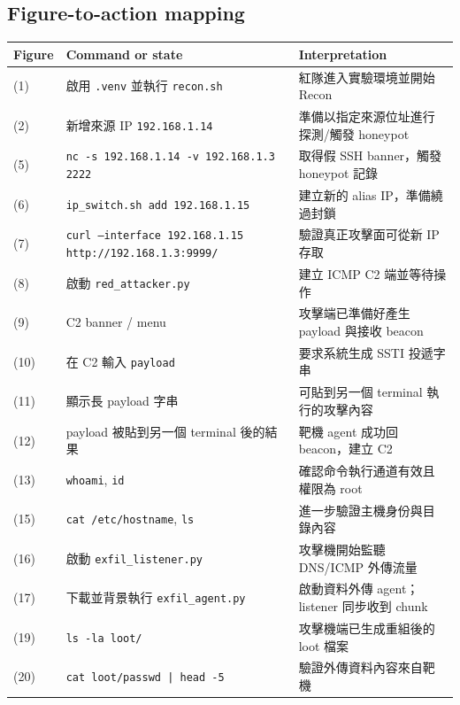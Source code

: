 \documentclass[UTF8,11pt]{ctexart}
\begin{document}
\subsection{Figure-to-action mapping}
\begin{longtable}{>{\raggedright\arraybackslash}p{2.0cm} >{\raggedright\arraybackslash}p{5.0cm} >{\raggedright\arraybackslash}p{6.9cm}}
\toprule
Figure & Command or state & Interpretation \\
\midrule
(1) & 啟用 \texttt{.venv} 並執行 \texttt{recon.sh} & 紅隊進入實驗環境並開始 Recon \\
(2) & 新增來源 IP \texttt{192.168.1.14} & 準備以指定來源位址進行探測/觸發 honeypot \\
(5) & \texttt{nc -s 192.168.1.14 -v 192.168.1.3 2222} & 取得假 SSH banner，觸發 honeypot 記錄 \\
(6) & \texttt{ip\_switch.sh add 192.168.1.15} & 建立新的 alias IP，準備繞過封鎖 \\
(7) & \texttt{curl --interface 192.168.1.15 http://192.168.1.3:9999/} & 驗證真正攻擊面可從新 IP 存取 \\
(8) & 啟動 \texttt{red\_attacker.py} & 建立 ICMP C2 端並等待操作 \\
(9) & C2 banner / menu & 攻擊端已準備好產生 payload 與接收 beacon \\
(10) & 在 C2 輸入 \texttt{payload} & 要求系統生成 SSTI 投遞字串 \\
(11) & 顯示長 payload 字串 & 可貼到另一個 terminal 執行的攻擊內容 \\
(12) & payload 被貼到另一個 terminal 後的結果 & 靶機 agent 成功回 beacon，建立 C2 \\
(13) & \texttt{whoami}, \texttt{id} & 確認命令執行通道有效且權限為 root \\
(15) & \texttt{cat /etc/hostname}, \texttt{ls} & 進一步驗證主機身份與目錄內容 \\
(16) & 啟動 \texttt{exfil\_listener.py} & 攻擊機開始監聽 DNS/ICMP 外傳流量 \\
(17) & 下載並背景執行 \texttt{exfil\_agent.py} & 啟動資料外傳 agent；listener 同步收到 chunk \\
(19) & \texttt{ls -la loot/} & 攻擊機端已生成重組後的 loot 檔案 \\
(20) & \texttt{cat loot/passwd | head -5} & 驗證外傳資料內容來自靶機 \\
\bottomrule
\end{longtable}
\end{document}
